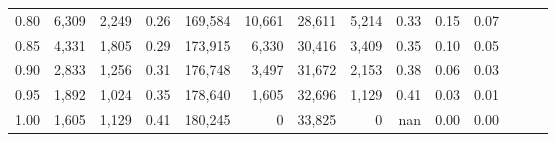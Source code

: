 \begin{tabular}{rrrrrrrrrrrrrr}
0.80 &   6,309 &  2,249 &  0.26 &  169,584 &   10,661 &  28,611 &   5,214 &  0.33 &  0.15 &      0.07 \\
0.85 &   4,331 &  1,805 &  0.29 &  173,915 &    6,330 &  30,416 &   3,409 &  0.35 &  0.10 &      0.05 \\
0.90 &   2,833 &  1,256 &  0.31 &  176,748 &    3,497 &  31,672 &   2,153 &  0.38 &  0.06 &      0.03 \\
0.95 &   1,892 &  1,024 &  0.35 &  178,640 &    1,605 &  32,696 &   1,129 &  0.41 &  0.03 &      0.01 \\
1.00 &   1,605 &  1,129 &  0.41 &  180,245 &        0 &  33,825 &       0 &   nan &  0.00 &      0.00 \\
\bottomrule
\end{tabular}
